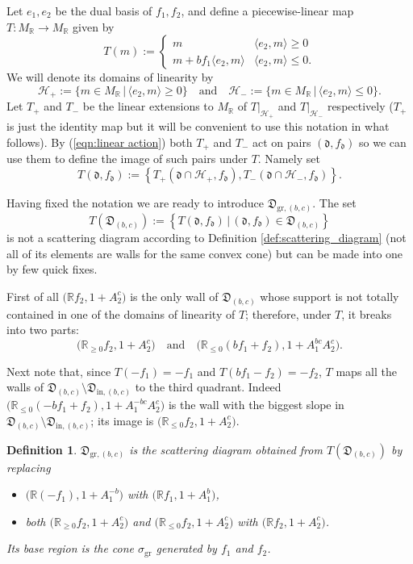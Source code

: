 \documentclass[12pt]{amsart}
\newtheorem{defn}[theorem]{Definition}
\theoremstyle{remark}
\numberwithin{equation}{section}
\newcommand{\RR}{\mathbb{R}}
\newcommand{\dd}{\mathfrak{d}}
\newcommand{\DD}{\mathfrak{D}}
\newcommand{\gr}{\mathrm{gr}}
\begin{document}
Let $e_1,e_2$ be the dual basis of $f_1, f_2$, and define a piecewise-linear map
$T:M_\RR\rightarrow M_\RR$ given by
\[
  T (m) := 
  \begin{cases}
    m   & \langle e_2 , m \rangle \geq 0 \\
    m + b f_1 \langle e_2, m \rangle & \langle e_2, m \rangle \leq 0.
  \end{cases}
\]
We will denote its domains of linearity by 
\[ 
  \mathcal{H}_{+} := 
  \{ m \in M_{\mathbb{R}}\, |\, \langle e_2 , m \rangle \geq 0 \} 
  \quad
  \mbox{and}
  \quad
  \mathcal{H}_{-} := 
  \{ m \in M_{\mathbb{R}} \,|\, \langle e_2 , m \rangle \leq 0 \}.
\]
Let $T_+$ and $T_-$ be the linear extensions to $M_\RR$ of $T|_{\mathcal{H}_+}$
and $T|_{\mathcal{H}_-}$ respectively ($T_+$ is just the identity map but it
will be convenient to use this notation in what follows). 
By (\ref{eqn:linear action}) both $T_+$ and $T_-$ act on pairs $(\dd,f_\dd)$ so
we can use them to define the image of such pairs under $T$. Namely set
\[
  T(\dd,f_\dd):=
  \left\{
    T_+\left(\dd\cap\mathcal{H}_+,f_\dd\right),
    T_-\left(\dd\cap\mathcal{H}_-,f_\dd\right)
  \right\}.
\]

Having fixed the notation we are ready to introduce $\DD_{\mathrm{gr},(b,c)}$.
The set
\[
  T(\DD_{(b,c)}):=
  \left\{
    T(\dd,f_\dd)\, |\, (\dd,f_\dd)\in \DD_{(b,c)}
  \right\}
\]
is not a scattering diagram according to Definition 
\ref{def:scattering_diagram} (not all of its elements are walls for the same
convex cone) but can be made into one by few quick fixes.

First of all $\big( \RR f_2, 1+A_2^c\big)$ is the only wall of $\DD_{(b,c)}$
whose support is not totally contained in one of the domains of linearity of
$T$; therefore, under $T$, it breaks into two parts:
\[
  \big( \RR_{\ge0} f_2, 1+A_2^c\big)
  \quad
  \mbox{and}
  \quad
  \big( \RR_{\le 0} (bf_1+f_2), 1+A_1^{bc}A_2^c\big).
\]

Next note that, since $T(-f_1)=-f_1$ and $T(bf_1-f_2)=-f_2$, $T$ maps all the
walls of $\DD_{(b,c)}\setminus\DD_{\mathrm{in},(b,c)}$ to the third quadrant. 
Indeed $\big(\RR_{\leq0}(-bf_1+f_2),1+A_1^{-bc}A_2^c\big)$ is the wall with the
biggest slope in $\DD_{(b,c)}\setminus\DD_{\mathrm{in},(b,c)}$; its image is
$\big( \RR_{\le0} f_2, 1+A_2^c\big)$.

\begin{defn}
  $\DD_{\gr,(b,c)}$ is the scattering diagram obtained from
  $T(\DD_{(b,c)})$ by replacing 
  \begin{itemize}
    \item
      $\big(\RR (-f_1), 1+A_1^{-b}\big)$ with $\big(\RR  f_1, 1+A_1^b\big)$,
    
    \item 
      both $ \big( \RR_{\ge0} f_2, 1+A_2^c\big)$ and $\big( \RR_{\le0} f_2,
      1+A_2^c\big)$ with $ \big( \RR f_2, 1+A_2^c\big)$.
  \end{itemize}
  Its base region is the cone $\sigma_\gr$ generated by $f_1$ and $f_2$.
\end{defn}
\end{document}
